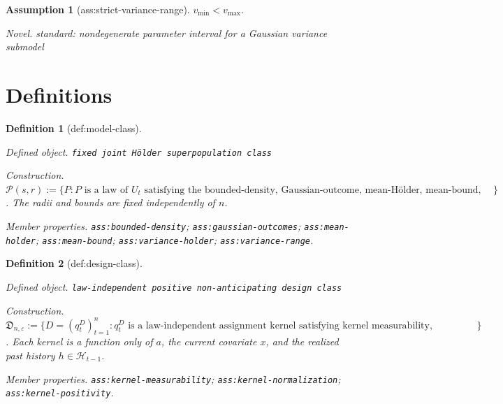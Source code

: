 \documentclass{article}
\newtheorem{assumption}{Assumption}
\newtheorem{definition}{Definition}
\begin{document}
\begin{assumption}[ass:strict-variance-range]\label{ass:strict-variance-range}
\(v_{\min}<v_{\max}\).
\par\smallskip\noindent\emph{Novel.} standard: nondegenerate parameter interval for a Gaussian variance submodel
\end{assumption}

\section{Definitions}

\begin{definition}[def:model-class]\label{def:model-class}
\par\smallskip\noindent\emph{Defined object.} \texttt{fixed joint Hölder superpopulation class}
\par\smallskip\noindent\emph{Construction.} \(\mathcal P(s,r):=\{P: P\text{ is a law of }U_t\text{ satisfying the bounded-density, Gaussian-outcome, mean-Hölder, mean-bound, variance-Hölder, and variance-range conditions}\}\). The radii and bounds are fixed independently of \(n\).
\par\smallskip\noindent\emph{Member properties.} \texttt{ass:\allowbreak{}bounded-\allowbreak{}density}; \texttt{ass:\allowbreak{}gaussian-\allowbreak{}outcomes}; \texttt{ass:\allowbreak{}mean-\allowbreak{}holder}; \texttt{ass:\allowbreak{}mean-\allowbreak{}bound}; \texttt{ass:\allowbreak{}variance-\allowbreak{}holder}; \texttt{ass:\allowbreak{}variance-\allowbreak{}range}.
\end{definition}

\begin{definition}[def:design-class]\label{def:design-class}
\par\smallskip\noindent\emph{Defined object.} \texttt{law-\allowbreak{}independent positive non-\allowbreak{}anticipating design class}
\par\smallskip\noindent\emph{Construction.} \(\mathfrak D_{n,\varepsilon}:=\{D=(q_t^D)_{t=1}^n: q_t^D\text{ is a law-independent assignment kernel satisfying kernel measurability, normalization, and positivity}\}\). Each kernel is a function only of \(a\), the current covariate \(x\), and the realized past history \(h\in\mathcal H_{t-1}\).
\par\smallskip\noindent\emph{Member properties.} \texttt{ass:\allowbreak{}kernel-\allowbreak{}measurability}; \texttt{ass:\allowbreak{}kernel-\allowbreak{}normalization}; \texttt{ass:\allowbreak{}kernel-\allowbreak{}positivity}.
\end{definition}
\end{document}
